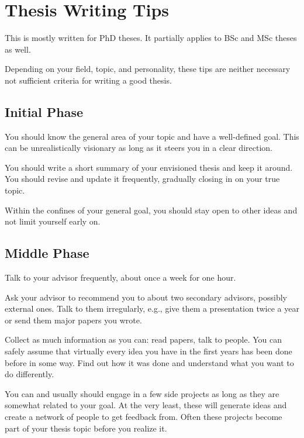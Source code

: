 \documentclass[12pt]{article}
\begin{document}
\section{Thesis Writing Tips}

This is mostly written for PhD theses.
It partially applies to BSc and MSc theses as well.

Depending on your field, topic, and personality, these tips are neither necessary not sufficient criteria for writing a good thesis.

\subsection{Initial Phase}

You should know the general area of your topic and have a well-defined goal.
This can be unrealistically visionary as long as it steers you in a clear direction.
\medskip

You should write a short summary of your envisioned thesis and keep it around.
You should revise and update it frequently, gradually closing in on your true topic.
\medskip

Within the confines of your general goal, you should stay open to other ideas and not limit yourself early on.

\subsection{Middle Phase}

Talk to your advisor frequently, about once a week for one hour.
\medskip

Ask your advisor to recommend you to about two secondary advisors, possibly external ones.
Talk to them irregularly, e.g., give them a presentation twice a year or send them major papers you wrote.
\medskip

Collect as much information as you can: read papers, talk to people.
You can safely assume that virtually every idea you have in the first years has been done before in some way.
Find out how it was done and understand what you want to do differently.
\medskip

You can and usually should engage in a few side projects as long as they are somewhat related to your goal.
At the very least, these will generate ideas and create a network of people to get feedback from.
Often these projects become part of your thesis topic before you realize it.
\medskip
\end{document}
